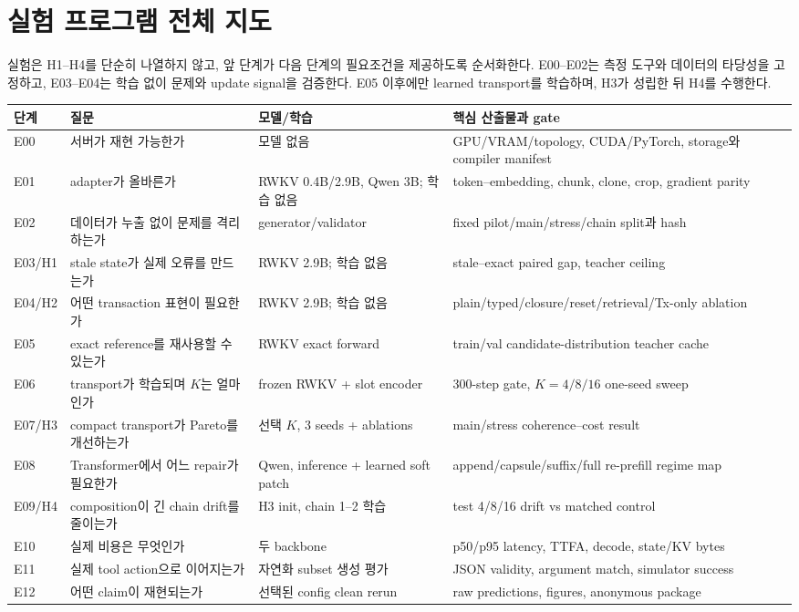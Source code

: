 \documentclass[10.5pt,a4paper]{article}
\begin{document}
\section{실험 프로그램 전체 지도}

실험은 H1--H4를 단순히 나열하지 않고, 앞 단계가 다음 단계의 필요조건을 제공하도록 순서화한다. E00--E02는 측정 도구와 데이터의 타당성을 고정하고, E03--E04는 학습 없이 문제와 update signal을 검증한다. E05 이후에만 learned transport를 학습하며, H3가 성립한 뒤 H4를 수행한다.

\begin{longtable}{@{}L{15mm}L{31mm}L{39mm}p{76mm}@{}}
\toprule
단계 & 질문 & 모델/학습 & 핵심 산출물과 gate \\
\midrule
\endhead
E00 & 서버가 재현 가능한가 & 모델 없음 & GPU/VRAM/topology, CUDA/PyTorch, storage와 compiler manifest \\
E01 & adapter가 올바른가 & RWKV 0.4B/2.9B, Qwen 3B; 학습 없음 & token--embedding, chunk, clone, crop, gradient parity \\
E02 & 데이터가 누출 없이 문제를 격리하는가 & generator/validator & fixed pilot/main/stress/chain split과 hash \\
E03/H1 & stale state가 실제 오류를 만드는가 & RWKV 2.9B; 학습 없음 & stale--exact paired gap, teacher ceiling \\
E04/H2 & 어떤 transaction 표현이 필요한가 & RWKV 2.9B; 학습 없음 & plain/typed/closure/reset/retrieval/Tx-only ablation \\
E05 & exact reference를 재사용할 수 있는가 & RWKV exact forward & train/val candidate-distribution teacher cache \\
E06 & transport가 학습되며 $K$는 얼마인가 & frozen RWKV + slot encoder & 300-step gate, $K=4/8/16$ one-seed sweep \\
E07/H3 & compact transport가 Pareto를 개선하는가 & 선택 $K$, 3 seeds + ablations & main/stress coherence--cost result \\
E08 & Transformer에서 어느 repair가 필요한가 & Qwen, inference + learned soft patch & append/capsule/suffix/full re-prefill regime map \\
E09/H4 & composition이 긴 chain drift를 줄이는가 & H3 init, chain 1--2 학습 & test 4/8/16 drift vs matched control \\
E10 & 실제 비용은 무엇인가 & 두 backbone & p50/p95 latency, TTFA, decode, state/KV bytes \\
E11 & 실제 tool action으로 이어지는가 & 자연화 subset 생성 평가 & JSON validity, argument match, simulator success \\
E12 & 어떤 claim이 재현되는가 & 선택된 config clean rerun & raw predictions, figures, anonymous package \\
\bottomrule
\end{longtable}
\end{document}
